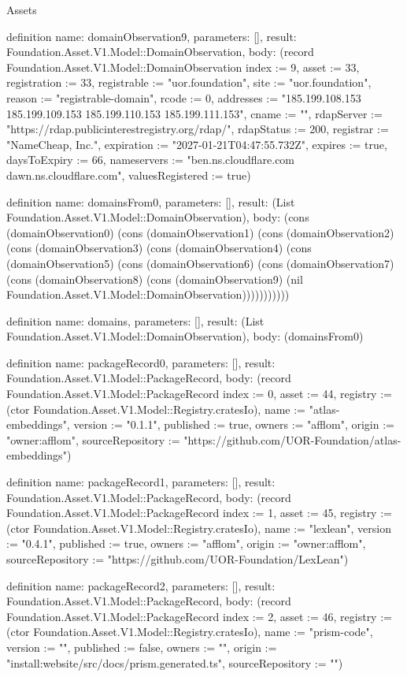 \begin{lexlean}{Assets}
\begin{semanticmodule}
definition{
  name: domainObservation9,
  parameters: [],
  result: Foundation.Asset.V1.Model::DomainObservation,
  body: (record Foundation.Asset.V1.Model::DomainObservation {index := 9, asset := 33, registration := 33, registrable := "uor.foundation", site := "uor.foundation", reason := "registrable-domain", rcode := 0, addresses := "185.199.108.153 185.199.109.153 185.199.110.153 185.199.111.153", cname := "", rdapServer := "https://rdap.publicinterestregistry.org/rdap/", rdapStatus := 200, registrar := "NameCheap, Inc.", expiration := "2027-01-21T04:47:55.732Z", expires := true, daysToExpiry := 66, nameservers := "ben.ns.cloudflare.com dawn.ns.cloudflare.com", valuesRegistered := true})
}

definition{
  name: domainsFrom0,
  parameters: [],
  result: (List Foundation.Asset.V1.Model::DomainObservation),
  body: (cons (domainObservation0) (cons (domainObservation1) (cons (domainObservation2) (cons (domainObservation3) (cons (domainObservation4) (cons (domainObservation5) (cons (domainObservation6) (cons (domainObservation7) (cons (domainObservation8) (cons (domainObservation9) (nil Foundation.Asset.V1.Model::DomainObservation)))))))))))
}

definition{
  name: domains,
  parameters: [],
  result: (List Foundation.Asset.V1.Model::DomainObservation),
  body: (domainsFrom0)
}

definition{
  name: packageRecord0,
  parameters: [],
  result: Foundation.Asset.V1.Model::PackageRecord,
  body: (record Foundation.Asset.V1.Model::PackageRecord {index := 0, asset := 44, registry := (ctor Foundation.Asset.V1.Model::Registry.cratesIo), name := "atlas-embeddings", version := "0.1.1", published := true, owners := "afflom", origin := "owner:afflom", sourceRepository := "https://github.com/UOR-Foundation/atlas-embeddings"})
}

definition{
  name: packageRecord1,
  parameters: [],
  result: Foundation.Asset.V1.Model::PackageRecord,
  body: (record Foundation.Asset.V1.Model::PackageRecord {index := 1, asset := 45, registry := (ctor Foundation.Asset.V1.Model::Registry.cratesIo), name := "lexlean", version := "0.4.1", published := true, owners := "afflom", origin := "owner:afflom", sourceRepository := "https://github.com/UOR-Foundation/LexLean"})
}

definition{
  name: packageRecord2,
  parameters: [],
  result: Foundation.Asset.V1.Model::PackageRecord,
  body: (record Foundation.Asset.V1.Model::PackageRecord {index := 2, asset := 46, registry := (ctor Foundation.Asset.V1.Model::Registry.cratesIo), name := "prism-code", version := "", published := false, owners := "", origin := "install:website/src/docs/prism.generated.ts", sourceRepository := ""})
}


\end{semanticmodule}
\end{lexlean}
